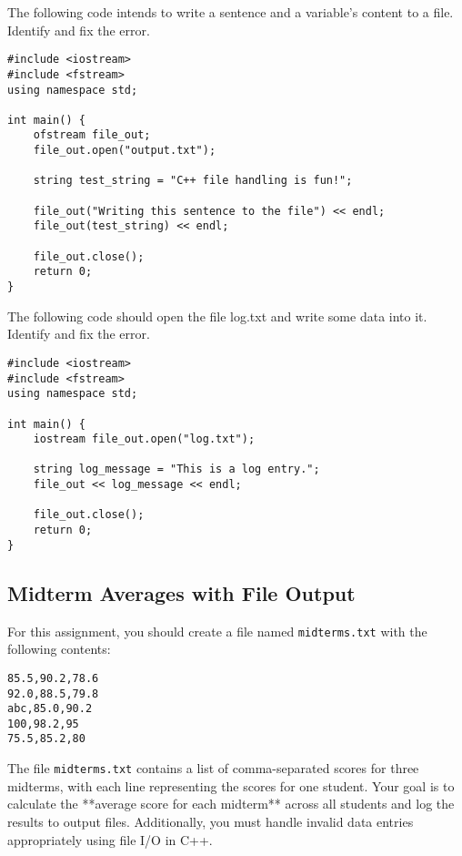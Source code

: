 \begin{multipart}
The following code intends to write a sentence and a variable's content to a file. Identify and fix the error.
\end{multipart}

\begin{verbatim}
#include <iostream>
#include <fstream>
using namespace std;

int main() {
    ofstream file_out;
    file_out.open("output.txt");

    string test_string = "C++ file handling is fun!";
    
    file_out("Writing this sentence to the file") << endl;
    file_out(test_string) << endl;

    file_out.close();
    return 0;
}
\end{verbatim}

\begin{multipart}
The following code should open the file log.txt and write some data into it. Identify and fix the error.
\end{multipart}

\begin{verbatim}
#include <iostream>
#include <fstream>
using namespace std;

int main() {
    iostream file_out.open("log.txt");

    string log_message = "This is a log entry.";
    file_out << log_message << endl;

    file_out.close();
    return 0;
}
\end{verbatim}

\newpage

\subsection{Midterm Averages with File Output}

For this assignment, you should create a file named \texttt{midterms.txt} with the following contents:

\begin{verbatim}
85.5,90.2,78.6
92.0,88.5,79.8
abc,85.0,90.2
100,98.2,95
75.5,85.2,80
\end{verbatim}

The file \texttt{midterms.txt} contains a list of comma-separated scores for three midterms, with each line representing the scores for one student. Your goal is to calculate the **average score for each midterm** across all students and log the results to output files. Additionally, you must handle invalid data entries appropriately using file I/O in C++.


